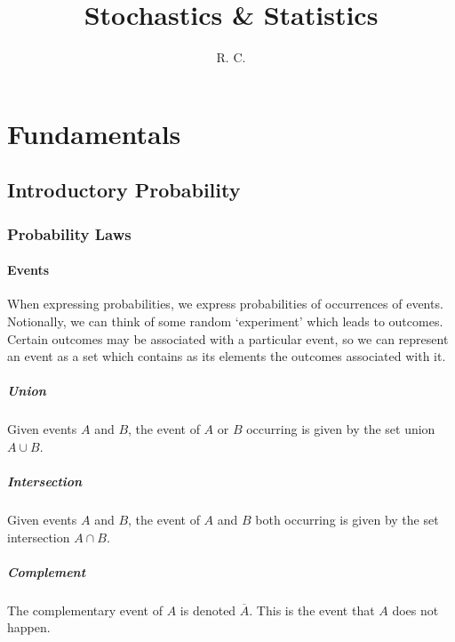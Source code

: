 \documentclass[11pt]{report} %
\title{Stochastics \& Statistics}
\author{R. C.}
\begin{document}
\maketitle
\thispagestyle{fancy}

\tableofcontents

\part{Fundamentals}

\chapter{Introductory Probability}

\section{Probability Laws}

\subsection{Events}

When expressing probabilities, we express probabilities of occurrences of events. Notionally, we can think of some random `experiment' which leads to outcomes. Certain outcomes may be associated with a particular event, so we can represent an event as a set which contains as its elements the outcomes associated with it.

\subsubsection{Union}

Given events $A$ and $B$, the event of $A$ or $B$ occurring is given by the set union $A \cup B$.

\subsubsection{Intersection}

Given events $A$ and $B$, the event of $A$ and $B$ both occurring is given by the set intersection $A \cap B$.

\subsubsection{Complement}

The complementary event of $A$ is denoted $\overline{A}$. This is the event that $A$ does not happen. \\
\end{document}
